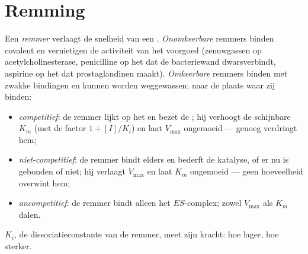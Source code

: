 \section{Remming}

\begin{definition}[Remmers]\label{def:b1:enzymes:inhibitors}
Een \emph{remmer} verlaagt de snelheid van een .
\emph{Onomkeerbare} remmers binden covalent en vernietigen de activiteit van het
 voorgoed (zenuwgassen op acetylcholinesterase, penicilline op het  dat
de bacteriewand dwarsverbindt, aspirine op het  dat prostaglandinen maakt).
\emph{Omkeerbare} remmers binden met zwakke bindingen en kunnen worden
weggewassen; naar de plaats waar zij binden:
\begin{itemize}
  \item \emph{competitief}: de remmer lijkt op
        het  en bezet de ; hij verhoogt de
        schijnbare $K_m$ (met de factor $1 + [I]/K_i$) en laat $V_{\max}$
        ongemoeid --- genoeg  verdringt hem;
  \item \emph{niet-competitief}: de remmer bindt elders en bederft de
        katalyse, of er nu  is gebonden of niet; hij verlaagt
        $V_{\max}$ en laat $K_m$ ongemoeid --- geen hoeveelheid 
        overwint hem;
  \item \emph{ancompetitief}: de remmer bindt alleen het $ES$-complex;
        zowel $V_{\max}$ als $K_m$ dalen.
\end{itemize}
$K_i$, de dissociatieconstante van de remmer, meet zijn kracht: hoe lager, hoe
sterker.
\end{definition}

